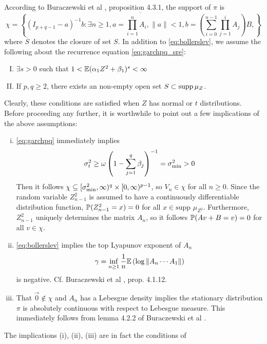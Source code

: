 \documentclass[aoas,preprint]{imsart}
\numberwithin{equation}{section}
\theoremstyle{plain}
\begin{document}
According to Buraczewski et al 
\cite{buraczewski:damek:mikosch:2016}, proposition 4.3.1, the support
of $\pi$ is
\[
\chi = \overline{
  \left\{
  (I_{p+q-1} - a)^{-1} b:
  \exists n \geq 1,
  a = \prod_{i=1}^n A_i,
  \|a\| < 1,
  b = \left(\sum_{i=0}^{n-1} \prod_{j=1}^i A_{j}\right) B,
  \right\}
}
\]
where $\overline S$ denotes the closure of set $S$.
In addition to \eqref{eq:bollerslev}, we assume the following about
the recurrence equation \eqref{eq:garchpq_sre}:
\begin{enumerate}[(I)]
\item $\exists s > 0$ such that
  $1 < \E (\alpha_1 Z^2 + \beta_1)^s < \infty$
\item If $p, q \geq 2$, there exists an non-empty open set
  $S \subset \supp \mu_Z$.
\end{enumerate}
Clearly, these conditions are satisfied when $Z$ has normal or $t$
distributions.
Before proceeding any further, it is worthwhile to point out a few
implications of the above assumptions:
\begin{enumerate}[(i)]
\item \eqref{eq:garchpq} immediately implies
  \[
  \sigma_t^2 \geq \omega \left(
    1 - \sum_{j=1}^q \beta_j
  \right)^{-1} = \sigma_{\m}^2 > 0
  \]
  Then it follows
  $\chi \subseteq [\sigma_{\m}^2, \infty)^q \times [0, \infty)^{p-1}$, so
  $V_n \in \chi$ for all $n \geq 0$. Since the random variable
  $Z_{n-1}^2$ is assumed to have a continuously differentiable
  distribution function,
  $\P(Z_{n-1}^2 = x) = 0$ for all $x \in \text{supp } \mu_{Z^2}$.
  Furthermore, $Z_{n-1}^2$ uniquely determines the matrix $A_n$,
  so it follows $\P(A v + B = v) = 0$ for all $v \in \chi$.

\item \eqref{eq:bollerslev} implies the top Lyapunov exponent of $A_n$
  \begin{equation}
    \label{eq:Lyapunov}
    \gamma = \inf_{n \geq 1} {1 \over n} \E \left(\log \| A_n \cdots A_1 \| \right)    
  \end{equation}
  is negative. Cf. Buraczewski et al
  \cite{buraczewski:damek:mikosch:2016}, prop. 4.1.12.

\item That $\vec 0 \notin \chi$ and $A_n$ has a Lebesgue density implies
  the stationary distribution $\pi$ is absolutely continuous with
  respect to Lebesgue measure. This immediately follows from lemma
  4.2.2 of Buraczewski et al \cite{buraczewski:damek:mikosch:2016}.
\end{enumerate}
The implications (i), (ii), (iii) are in fact the conditions of
\end{document}
